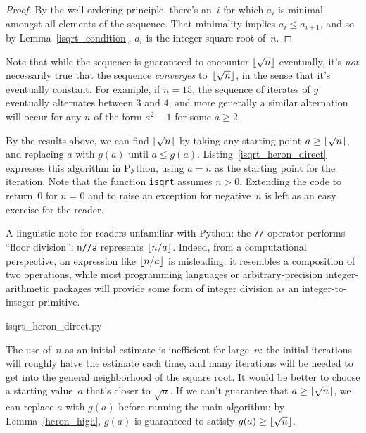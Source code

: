 \documentclass[a4paper]{article}
\DeclarePairedDelimiter\floor{\lfloor}{\rfloor}
\theoremstyle{plain}
\theoremstyle{definition}
\begin{document}
\begin{proof}
  By the well-ordering principle, there's an~$i$ for which $a_i$ is minimal
  amongst all elements of the sequence. That minimality implies $a_i \le
  a_{i+1}$, and so by Lemma~\ref{isqrt_condition}, $a_i$ is the integer square
  root of~$n$.
\end{proof}

Note that while the sequence is guaranteed to encounter $\floor{\sqrt n}$
eventually, it's \emph{not} necessarily true that the sequence \emph{converges}
to~$\floor{\sqrt n}$, in the sense that it's eventually constant. For
example, if $n=15$, the sequence of iterates of $g$ eventually alternates
between $3$ and $4$, and more generally a similar alternation will occur for
any $n$ of the form $a^2 - 1$ for some $a \ge 2$.

By the results above, we can find $\floor{\sqrt n}$ by taking any starting
point $a \ge \floor{\sqrt n}$, and replacing $a$ with $g(a)$ until $a\le g(a)$.
Listing~\ref{isqrt_heron_direct} expresses this algorithm in Python, using
$a=n$ as the starting point for the iteration. Note that the function
\lstinline$isqrt$ assumes $n > 0$. Extending the code to return~$0$ for $n=0$
and to raise an exception for negative~$n$ is left as an easy exercise for the
reader.

A linguistic note for readers unfamiliar with Python: the \lstinline$//$
operator performs ``floor division'': \lstinline$n//a$ represents $\floor{n /
a}$. Indeed, from a computational perspective, an expression like $\floor{n /
a}$ is misleading: it resembles a composition of two operations, while most
programming languages or arbitrary-precision integer-arithmetic packages will
provide some form of integer division as an integer-to-integer primitive.


  {isqrt_heron_direct.py}

The use of~$n$ as an initial estimate is inefficient for large~$n$: the initial
iterations will roughly halve the estimate each time, and many iterations will
be needed to get into the general neighborhood of the square root. It would be
better to choose a starting value~$a$ that's closer to $\sqrt n$. If we can't
guarantee that $a\ge \floor{\sqrt n}$, we can replace $a$ with $g(a)$ before
running the main algorithm: by Lemma~\ref{heron_high}, $g(a)$ is guaranteed to
satisfy $g(a) \ge \floor{\sqrt n}$.
\end{document}

